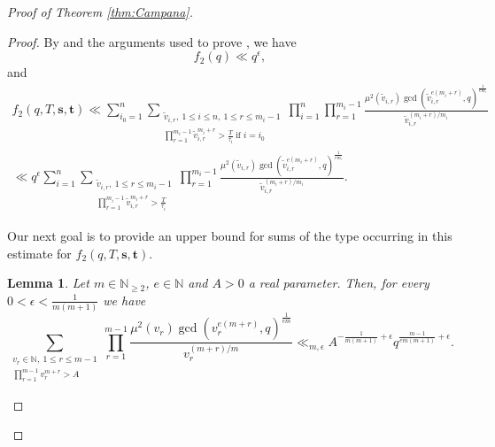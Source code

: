 \documentclass[10pt, a4paper, reqno, english]{amsart}
\newtheorem{lemma}[theorem]{Lemma}
\theoremstyle{definition}
\numberwithin{theorem}{section}
\numberwithin{equation}{section}
\begin{document}
\begin{proof}[Proof of Theorem \ref{thm:Campana}]
\begin{proof}
By \cite[(3.10)]{BY} and the arguments used to prove \cite[(3.9)]{BY}, we have
\begin{equation}\label{f2}
f_2(q)\ll q^{\epsilon},
\end{equation}
and
\begin{gather*}
f_2(q,T,\mathbf{s},\mathbf{t})\ll \sum_{i_0=1}^n \sum_{\substack{\tilde v_{i,r},\ 1\leq i\leq n,\ 1\leq r\leq m_i-1\\\prod_{r=1}^{m_i-1}\tilde v_{i,r}^{m_i+r}>\frac{T}{\tau_i}\ \text{if } i=i_0}} \prod_{i=1}^n\prod_{r=1}^{m_i-1}\frac{\mu^2(\tilde v_{i,r})\gcd(\tilde v_{i,r}^{e(m_i+r)},q)^\frac 1{em_i}}{\tilde v_{i,r}^{(m_i+r)/m_i}}\\
\ll q^{\epsilon} \sum_{i=1}^n \sum_{\substack{\tilde v_{i,r},\ 1\leq r\leq m_i-1\\\prod_{r=1}^{m_i-1}\tilde v_{i,r}^{m_i+r}>\frac{T}{\tau_i} }} \prod_{r=1}^{m_i-1}\frac{\mu^2(\tilde v_{i,r})\gcd(\tilde v_{i,r}^{e(m_i+r)},q)^\frac 1{em_i}}{\tilde v_{i,r}^{(m_i+r)/m_i}}.
\end{gather*}

Our next goal is to provide an upper bound for sums of the type occurring in this estimate for $f_2(q,T, \mathbf{s},\mathbf{t})$.

\begin{lemma}\label{lemdecay}
Let $m\in \mathbb{N}_{\geq 2}$, $e\in \mathbb{N}$ and $A>0$ a real parameter. Then, for every $0<\epsilon <\frac{1}{m(m+1)}$ we have
\begin{equation*}
 \sum_{\substack{ v_{r}\in \mathbb{N},\ 1\leq r\leq m-1\\\prod_{r=1}^{m-1} v_{r}^{m+r}>A }} \prod_{r=1}^{m-1}\frac{\mu^2( v_{r})\gcd( v_{r}^{e(m+r)},q)^\frac 1{em}}{ v_{r}^{(m+r)/m}} \ll_{m,\epsilon} A^{-\frac{1}{m(m+1)}+\epsilon} q^{\frac{m-1}{em(m+1)}+\epsilon}.
\end{equation*}


\end{lemma}


\end{proof}
\end{proof}
\end{document}
